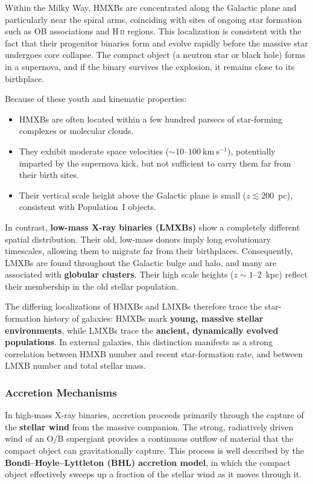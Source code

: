 \par
Within the Milky Way, HMXBs are concentrated along the Galactic plane and particularly near the spiral arms, coinciding with sites of ongoing star formation such as OB associations and H\,\textsc{ii} regions. This localization is consistent with the fact that their progenitor binaries form and evolve rapidly before the massive star undergoes core collapse. The compact object (a neutron star or black hole) forms in a supernova, and if the binary survives the explosion, it remains close to its birthplace.
\par
Because of these youth and kinematic properties:
\begin{itemize}
    \item HMXBs are often located within a few hundred parsecs of star-forming complexes or molecular clouds.
    \item They exhibit moderate space velocities ($\sim 10$--$100~\mathrm{km~s^{-1}}$), potentially imparted by the supernova kick, but not sufficient to carry them far from their birth sites.
    \item Their vertical scale height above the Galactic plane is small ($z \lesssim 200$~pc), consistent with Population~I objects.
\end{itemize}
\par
In contrast, \textbf{low-mass X-ray binaries (LMXBs)} show a completely different spatial distribution. Their old, low-mass donors imply long evolutionary timescales, allowing them to migrate far from their birthplaces. Consequently, LMXBs are found throughout the Galactic bulge and halo, and many are associated with \textbf{globular clusters}. Their high scale heights ($z \sim 1$--$2$~kpc) reflect their membership in the old stellar population.
\par
The differing localizations of HMXBs and LMXBs therefore trace the star-formation history of galaxies: 
HMXBs mark \textbf{young, massive stellar environments}, while LMXBs trace the \textbf{ancient, dynamically evolved populations}. In external galaxies, this distinction manifests as a strong correlation between HMXB number and recent star-formation rate, and between LMXB number and total stellar mass.

\subsubsection{Accretion Mechanisms}

In high-mass X-ray binaries, accretion proceeds primarily through the capture of the \textbf{stellar wind} from the massive companion. The strong, radiatively driven wind of an O/B supergiant provides a continuous outflow of material that the compact object can gravitationally capture. This process is well described by the \textbf{Bondi–Hoyle–Lyttleton (BHL) accretion model}, in which the compact object effectively sweeps up a fraction of the stellar wind as it moves through it.

